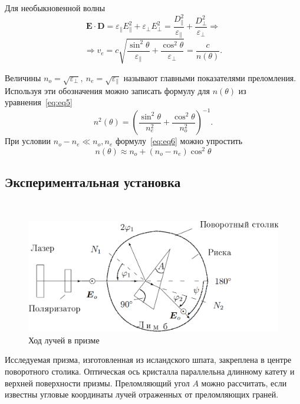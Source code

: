 \documentclass[12pt]{article}
\renewcommand{\vec}{\textbf}
\begin{document}
    Для необыкновенной волны
    \begin{equation*}
        \vec{E}\cdot\vec{D} = \varepsilon_{\parallel} E_{\parallel}^2 + \varepsilon_{\perp} E_{\perp}^2 =
        \frac{D_{\parallel}^2}{\varepsilon_{\parallel}} +  \frac{D_{\perp}^2}{\varepsilon_{\perp}} \Rightarrow
    \end{equation*}
    \begin{equation}
        \label{eq:eq5}
        \Rightarrow
        v_e = c\sqrt{\frac{\sin^2{\theta}}{\varepsilon_{\parallel}} + \frac{\cos^2{\theta}}{\varepsilon_{\perp}}} =
        \frac{c}{n(\theta)}.
    \end{equation}

    Величины $n_o = \sqrt{\varepsilon_{\perp}},\ n_e = \sqrt{\varepsilon_{\parallel}}$
    называют главными показателями преломления.
    Используя эти обозначения можно записать формулу для $n(\theta)$ из уравнения\ \eqref{eq:eq5}
    \begin{equation}
        \label{eq:eq6}
        n^2(\theta) = \left(\frac{\sin^2{\theta}}{n_e^2} +
        \frac{\cos^2{\theta}}{n_o^2}\right)^{-1}.
    \end{equation}
    При условии $n_o - n_e \ll n_o, n_e$ формулу\ \eqref{eq:eq6} можно упростить
    \begin{equation}
        \label{eq:eq7}
        n(\theta) \approx n_o + (n_o - n_e)\cos^2{\theta}
    \end{equation}

    \subsection*{Экспериментальная установка}
    \ \par
    \begin{figure}
        \label{fig:fig2}
        \centering
        \includegraphics[width=\linewidth]{pic/setup}
        \caption{Ход лучей в призме}
    \end{figure}
    Исследуемая призма, изготовленная из исландского шпата, закреплена в центре поворотного столика.
    Оптическая ось кристалла параллельна длинному катету и верхней поверхности призмы.
    Преломляющий угол $A$ можно рассчитать, если известны угловые координаты лучей отраженных от
    преломляющих граней.
\end{document}
